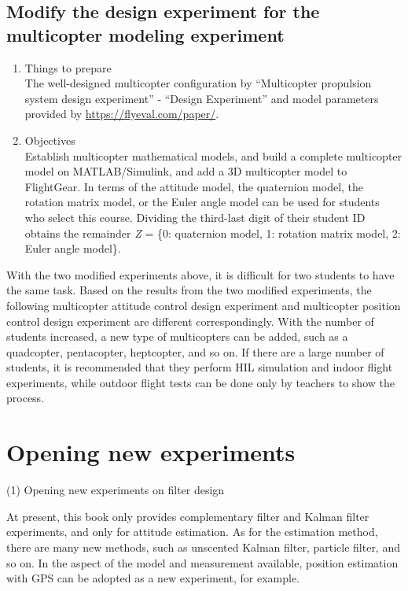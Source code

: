\subsection{Modify the design experiment for the multicopter modeling experiment}
\begin{enumerate}[(1) ]
\item Things to prepare\\
The well-designed multicopter configuration by ``Multicopter propulsion
system design experiment'' - ``Design Experiment'' and model parameters
provided by \url{https://flyeval.com/paper/}.
\item Objectives\\
Establish multicopter mathematical models, and build a complete multicopter
model on MATLAB/Simulink, and add a 3D multicopter model to FlightGear.
In terms of the attitude model, the quaternion model, the rotation
matrix model, or the Euler angle model can be used for students who
select this course. Dividing the third-last digit of their student
ID obtains the remainder \textit{Z }= \{0: quaternion model, 1: rotation
matrix model, 2: Euler angle model\}.
\end{enumerate}
With the two modified experiments above, it is difficult for two students
to have the same task. Based on the results from the two modified
experiments, the following multicopter attitude control design experiment
and multicopter position control design experiment are different correspondingly.
With the number of students increased, a new type of multicopters
can be added, such as a quadcopter, pentacopter, heptcopter, and so
on. If there are a large number of students, it is recommended that
they perform HIL simulation and indoor flight experiments, while outdoor
flight tests can be done only by teachers to show the process.

\section{Opening new experiments}

(1) Opening new experiments on filter design\textbf{ }

At present, this book only provides complementary filter and Kalman
filter experiments, and only for attitude estimation. As for the estimation
method, there are many new methods, such as unscented Kalman filter,
particle filter, and so on. In the aspect of the model and measurement
available, position estimation with GPS can be adopted as a new experiment,
for example. 


